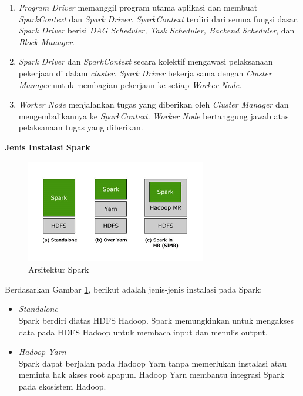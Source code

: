 \documentclass[a4paper,twoside]{article}
\begin{document}
\begin{enumerate}
\begin{enumerate}

\item
\textit{Program Driver} memanggil program utama aplikasi dan membuat \textit{SparkContext} dan \textit{Spark Driver}. \textit{SparkContext} terdiri dari semua fungsi dasar. \textit{Spark Driver} berisi \textit{DAG Scheduler, Task Scheduler, Backend Scheduler}, dan \textit{Block Manager}.

\item
\textit{Spark Driver} dan \textit{SparkContext} secara kolektif mengawasi pelaksanaan pekerjaan di dalam \textit{cluster}. \textit{Spark Driver} bekerja sama dengan \textit{Cluster Manager} untuk membagian pekerjaan ke setiap \textit{Worker Node}. 

\item
\textit{Worker Node} menjalankan tugas yang diberikan oleh \textit{Cluster Manager} dan mengembalikannya ke \textit{SparkContext}. \textit{Worker Node} bertanggung jawab atas pelaksanaan tugas yang diberikan. 

\end{enumerate}


\textbf{Jenis Instalasi Spark}

\begin{figure}[H]
	\centering
	\includegraphics[scale=0.55]{arsitektur_spark}
	\caption{Arsitektur Spark}
	\label{fig:arsitektur_spark}
\end{figure}

Berdasarkan Gambar \ref{fig:arsitektur_spark}, berikut adalah jenis-jenis instalasi pada Spark:

\begin{itemize}
\item \textit{Standalone}\\  
Spark berdiri diatas HDFS Hadoop. Spark memungkinkan untuk mengakses data pada HDFS Hadoop untuk membaca input dan menulis output.

\item \textit{Hadoop Yarn}\\
Spark dapat berjalan pada Hadoop Yarn tanpa memerlukan instalasi atau meminta hak akses root apapun. Hadoop Yarn membantu integrasi Spark pada ekosistem Hadoop.


\end{itemize}
\end{enumerate}
\end{document}
